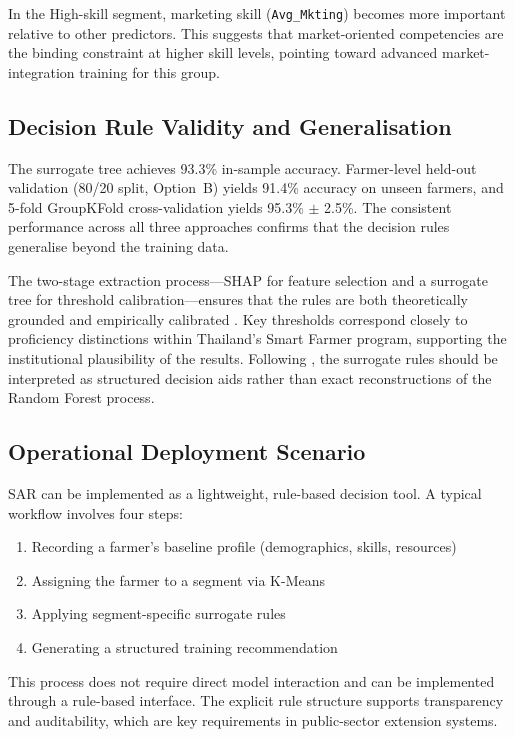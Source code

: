 \documentclass[3p,twocolumn,authoryear]{elsarticle}
\begin{document}
In the High-skill segment, marketing skill (\texttt{Avg\_Mkting}) becomes more
important relative to other predictors. This suggests that market-oriented
competencies are the binding constraint at higher skill levels, pointing toward
advanced market-integration training for this group.

\subsection{Decision Rule Validity and Generalisation}

The surrogate tree achieves 93.3\% in-sample accuracy. Farmer-level held-out
validation (80/20 split, Option~B) yields 91.4\% accuracy on unseen farmers, and
5-fold GroupKFold cross-validation yields 95.3\% $\pm$ 2.5\%. The consistent
performance across all three approaches confirms that the decision rules
generalise beyond the training data.

The two-stage extraction process—SHAP for feature selection and a surrogate tree
for threshold calibration—ensures that the rules are both theoretically grounded
and empirically calibrated \citep{molnar2022}. Key thresholds correspond closely
to proficiency distinctions within Thailand’s Smart Farmer program, supporting
the institutional plausibility of the results. Following \citet{rudin2019}, the
surrogate rules should be interpreted as structured decision aids rather than
exact reconstructions of the Random Forest process.

\subsection{Operational Deployment Scenario}

SAR can be implemented as a lightweight, rule-based decision tool. A typical
workflow involves four steps:
\begin{enumerate}
  \item Recording a farmer’s baseline profile (demographics, skills, resources)
  \item Assigning the farmer to a segment via K-Means
  \item Applying segment-specific surrogate rules
  \item Generating a structured training recommendation
\end{enumerate}

This process does not require direct model interaction and can be implemented
through a rule-based interface. The explicit rule structure supports
transparency and auditability, which are key requirements in public-sector
extension systems.
\end{document}

